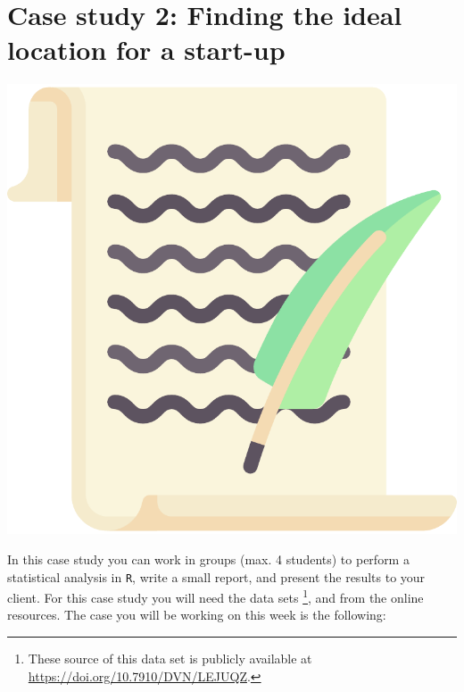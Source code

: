 
\begin{minipage}{0.8\textwidth}
\section{Case study 2: Finding the ideal location for a start-up}
\end{minipage}%
\hfill%
\begin{minipage}{0.1\textwidth}
\includegraphics[width=\linewidth]{Files/Images/lettericon.pdf}
\end{minipage}
\vspace*{.1cm}

In this case study you can work in groups (max. 4 students) to perform a statistical analysis in \texttt{R}, write a small report, and present the results to your client. For this case study you will need the data sets \footnote{These source of this data set is publicly available at \url{https://doi.org/10.7910/DVN/LEJUQZ}.},  and  from the online resources. The case you will be working on this week is the following: \\

